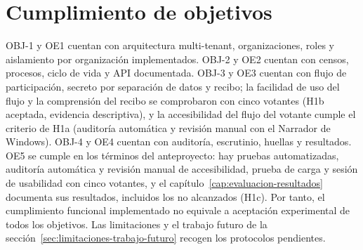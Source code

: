 \section{Cumplimiento de objetivos}
OBJ-1 y OE1 cuentan con arquitectura multi-tenant, organizaciones, roles y
aislamiento por organización implementados. OBJ-2 y OE2 cuentan con censos,
procesos, ciclo de vida y API documentada. OBJ-3 y OE3 cuentan con flujo de
participación, secreto por separación de datos y recibo; la facilidad de uso del flujo
y la comprensión del recibo se comprobaron con cinco votantes (H1b aceptada,
evidencia descriptiva), y la accesibilidad del flujo del votante cumple el criterio de H1a
(auditoría automática y revisión manual con el Narrador de Windows). OBJ-4 y OE4 cuentan con auditoría,
escrutinio, huellas y resultados. OE5 se cumple en los términos del
anteproyecto: hay pruebas automatizadas, auditoría automática y revisión manual de accesibilidad,
prueba de carga y sesión de usabilidad con cinco votantes, y el
capítulo~\ref{cap:evaluacion-resultados} documenta sus resultados, incluidos
los no alcanzados (H1c).
Por tanto, el cumplimiento funcional implementado no equivale a aceptación
experimental de todos los objetivos. Las limitaciones y el trabajo futuro de
la sección~\ref{sec:limitaciones-trabajo-futuro} recogen los protocolos
pendientes.

